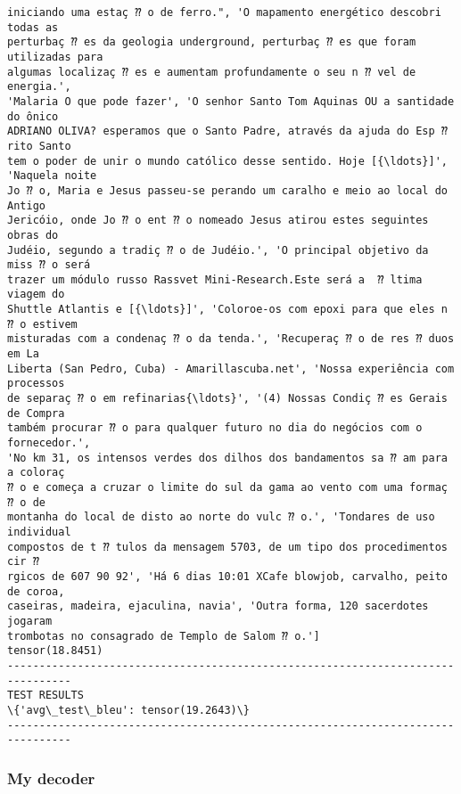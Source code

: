 \documentclass[10pt]{article}
\begin{document}
\begin{Verbatim}[commandchars=\\\{\}]
iniciando uma estaç ⁇ o de ferro.", 'O mapamento energético descobri todas as
perturbaç ⁇ es da geologia underground, perturbaç ⁇ es que foram utilizadas para
algumas localizaç ⁇ es e aumentam profundamente o seu n ⁇ vel de energia.',
'Malaria O que pode fazer', 'O senhor Santo Tom Aquinas OU a santidade do ônico
ADRIANO OLIVA? esperamos que o Santo Padre, através da ajuda do Esp ⁇ rito Santo
tem o poder de unir o mundo católico desse sentido. Hoje [{\ldots}]', 'Naquela noite
Jo ⁇ o, Maria e Jesus passeu-se perando um caralho e meio ao local do Antigo
Jericóio, onde Jo ⁇ o ent ⁇ o nomeado Jesus atirou estes seguintes obras do
Judéio, segundo a tradiç ⁇ o de Judéio.', 'O principal objetivo da miss ⁇ o será
trazer um módulo russo Rassvet Mini-Research.Este será a  ⁇ ltima viagem do
Shuttle Atlantis e [{\ldots}]', 'Coloroe-os com epoxi para que eles n ⁇ o estivem
misturadas com a condenaç ⁇ o da tenda.', 'Recuperaç ⁇ o de res ⁇ duos em La
Liberta (San Pedro, Cuba) - Amarillascuba.net', 'Nossa experiência com processos
de separaç ⁇ o em refinarias{\ldots}', '(4) Nossas Condiç ⁇ es Gerais de Compra
também procurar ⁇ o para qualquer futuro no dia do negócios com o fornecedor.',
'No km 31, os intensos verdes dos dilhos dos bandamentos sa ⁇ am para a coloraç
⁇ o e começa a cruzar o limite do sul da gama ao vento com uma formaç ⁇ o de
montanha do local de disto ao norte do vulc ⁇ o.', 'Tondares de uso individual
compostos de t ⁇ tulos da mensagem 5703, de um tipo dos procedimentos cir ⁇
rgicos de 607 90 92', 'Há 6 dias 10:01 XCafe blowjob, carvalho, peito de coroa,
caseiras, madeira, ejaculina, navia', 'Outra forma, 120 sacerdotes jogaram
trombotas no consagrado de Templo de Salom ⁇ o.']
tensor(18.8451)
--------------------------------------------------------------------------------
TEST RESULTS
\{'avg\_test\_bleu': tensor(19.2643)\}
--------------------------------------------------------------------------------

    \end{Verbatim}

    \hypertarget{my-decoder}{%
\subsubsection*{My decoder}\label{my-decoder}}
\end{document}
